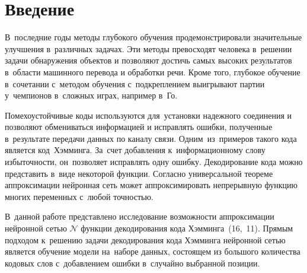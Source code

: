 \section{Введение}

В~последние годы методы глубокого обучения продемонстрировали значительные улучшения в~различных задачах\cite{bib:buhrstein}. Эти методы превосходят человека в~решении задачи обнаружения объектов и позволяют достичь самых высоких результатов в~области машинного перевода и обработки речи. Кроме того, глубокое обучение в~сочетании с~методом обучения с~подкреплением выигрывают партии у~чемпионов в~сложных играх, например в~Го\cite[c.\,484–489]{bib:win_go}.

Помехоустойчивые коды\cite[с.\,4]{bib:codes} используются для~установки надежного соединения и позволяют обмениваться информацией и исправлять ошибки, полученные в~результате передачи данных по каналу связи. Одним~из~примеров такого кода является код~Хэмминга\cite[с.\,49]{bib:codes2}. За~счет добавления к~информационному слову избыточности, он~позволяет исправлять одну ошибку. Декодирование\cite[c.\,5]{bib:codes} кода можно представить в~виде некоторой функции. Согласно универсальной теореме аппроксимации\cite{bib:approximation_theorem} нейронная сеть\cite[с.\,23]{bib:neural_networks} может аппроксимировать непрерывную функцию многих переменных с~любой точностью.

В~данной работе представлено исследование возможности аппроксимации нейронной сетью $\mathcal{N}$ функции декодирования кода Хэмминга~(16,~11). Прямым подходом к~решению задачи декодирования кода Хэмминга нейронной сетью является обучение модели на~наборе данных, состоящем из большого количества кодовых слов с~добавлением ошибки в~случайно выбранной позиции.


\newpage 